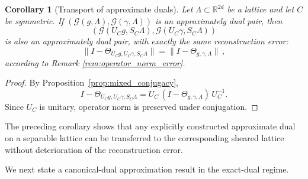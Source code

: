 \documentclass[final,1p,times,authoryear]{elsarticle}
\newtheorem{corollary}[theorem]{Corollary}
\theoremstyle{definition}
\newcommand{\R}{\mathbb{R}}
\newcommand{\1}{\mathbf{1}}
\begin{document}
\begin{corollary}[Transport of approximate duals]\label{cor:approx_dual_transport}
Let $\Lambda\subset \R^{2d}$ be a lattice and let $C$ be symmetric.
If $(\mathcal G(g,\Lambda),\mathcal G(\gamma,\Lambda))$ is an approximately dual pair, then
$$
(\mathcal G(U_C g,S_C\Lambda),\mathcal G(U_C\gamma,S_C\Lambda))
$$
is also an approximately dual pair, with exactly the same reconstruction error:
$$
\|I-\Theta_{U_C g,U_C\gamma,S_C\Lambda}\|
=
\|I-\Theta_{g,\gamma,\Lambda}\|\, ,
$$
according to Remark \ref{rem:operator_norm_error}.
\end{corollary}
{\begin{proof}
By Proposition~\ref{prop:mixed_conjugacy},
$$
I-\Theta_{U_C g,U_C\gamma,S_C\Lambda}
=
U_C\,(I-\Theta_{g,\gamma,\Lambda})\,U_C^{-1}.
$$
Since $U_C$ is unitary, operator norm is preserved under conjugation.
\end{proof}}

The preceding corollary shows that any explicitly constructed approximate dual on a separable lattice can be transferred to the corresponding sheared lattice without deterioration of the reconstruction error.

We next state a canonical-dual approximation result in the exact-dual regime.
\end{document}
